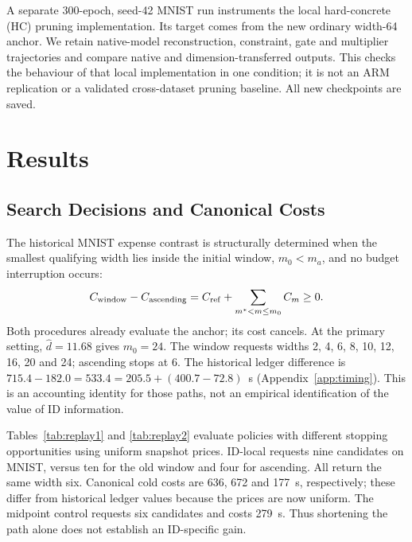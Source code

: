 \documentclass[make,article,submit,pdftex,moreauthors]{Definitions/mdpi}
\begin{document}
A separate 300-epoch, seed-42 MNIST run instruments the local
hard-concrete (HC) pruning implementation. Its target comes from the
new ordinary width-64 anchor. We retain native-model reconstruction,
constraint, gate and multiplier trajectories and compare native and
dimension-transferred outputs. This checks the behaviour of that local
implementation in one condition; it is not an ARM replication or a
validated cross-dataset pruning baseline. All new checkpoints are saved.

\section{Results}\label{sec:results}

\subsection{Search Decisions and Canonical Costs}\label{sec:replayresults}
The historical MNIST expense contrast is structurally determined when
the smallest qualifying width lies inside the initial window,
$m_0<m_a$, and no budget interruption occurs:
\begin{equation}
 C_{\rm window}-C_{\rm ascending}
 =C_{\rm ref}+\sum_{m^*<m\le m_0}C_m\ge0.
 \label{eq:dominance}
\end{equation}
Both procedures already evaluate the anchor; its cost cancels.
At the primary setting, $\hat d=11.68$ gives $m_0=24$.
The window requests widths 2, 4, 6, 8, 10, 12, 16, 20 and 24;
ascending stops at 6. The historical ledger difference is
$715.4-182.0=533.4=205.5+(400.7-72.8)$~s
(Appendix~\ref{app:timing}). This is an accounting identity for those
paths, not an empirical identification of the value of ID information.

Tables~\ref{tab:replay1} and \ref{tab:replay2} evaluate policies with
different stopping opportunities using uniform snapshot prices.
ID-local requests nine candidates on MNIST, versus ten for the old
window and four for ascending. All return the same width six.
Canonical cold costs are 636, 672 and 177~s, respectively; these differ
from historical ledger values because the prices are now uniform.
The midpoint control requests six candidates and costs 279~s.
Thus shortening the path alone does not establish an ID-specific gain.
\end{document}
